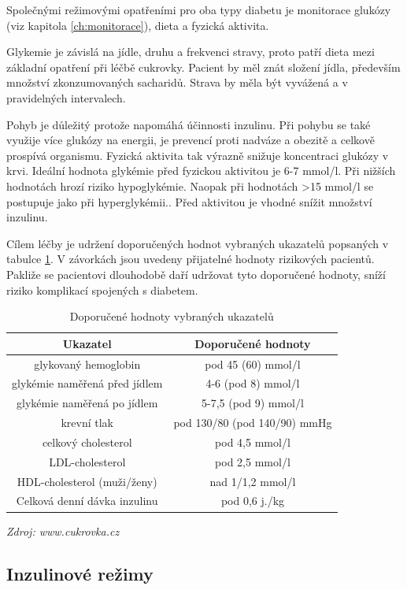 Společnými režimovými opatřeními pro oba typy diabetu je monitorace glukózy (viz kapitola \ref{ch:monitorace}), dieta a fyzická aktivita.

Glykemie je závislá na jídle, druhu a frekvenci stravy, proto patří dieta mezi základní opatření při léčbě cukrovky. Pacient by měl znát složení jídla, především množství zkonzumovaných sacharidů. Strava by měla být vyvážená a v pravidelných intervalech.

Pohyb je důležitý protože napomáhá účinnosti inzulinu. Při pohybu se také využije více glukózy na energii, je prevencí proti nadváze a obezitě a celkově prospívá organismu. Fyzická aktivita tak výrazně snižuje koncentraci glukózy v krvi. Ideální hodnota glykémie před fyzickou aktivitou je 6-7 mmol/l. Při nižších hodnotách hrozí riziko hypoglykémie. Naopak při hodnotách >15 mmol/l se postupuje jako při hyperglykémii.. Před aktivitou je vhodné snížit množství inzulinu.

Cílem léčby je udržení doporučených hodnot vybraných ukazatelů popsaných v tabulce \ref{tab:ukazatele}. V závorkách jsou uvedeny přijatelné hodnoty rizikových pacientů. Pakliže se pacientovi dlouhodobě daří udržovat tyto doporučené hodnoty, sníží riziko komplikací spojených s diabetem.
\cite{Diabetes.Psottova,cukrovka.cz}

\begin{table}[H]
\caption{Doporučené hodnoty vybraných ukazatelů}
\label{tab:ukazatele}
\centering
\begin{tabular}{|c|c|}
\hline 
\textbf{Ukazatel} & \textbf{Doporu\v{c}ené hodnoty}\tabularnewline
\hline 
\hline 
glykovaný hemoglobin & pod 45 (60) mmol/l\\ \hline 
glykémie naměřená před jídlem & 4-6 (pod 8) mmol/l\\ \hline 
glykémie naměřená po jídlem & 5-7,5 (pod 9) mmol/l\\ \hline 
krevní tlak & pod 130/80 (pod 140/90) mmHg\\ \hline 
celkový cholesterol & pod 4,5 mmol/l\\ \hline 
LDL-cholesterol & pod 2,5 mmol/l\\ \hline 
HDL-cholesterol (muži/ženy) & nad 1/1,2 mmol/l\\ \hline 
Celková denní dávka inzulinu & pod 0,6 j./kg\\
\hline 
\end{tabular}
\textit{Zdroj: www.cukrovka.cz \citep{cukrovka.cz}}
\end{table}


\subsection{Inzulinové režimy}
\label{ch:inzulin}

